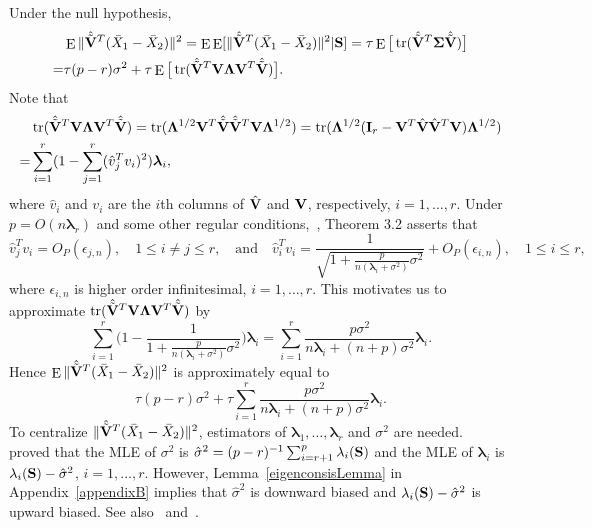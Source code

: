 \documentclass[review]{elsarticle}
\DeclareMathOperator{\mytr}{tr}
\DeclareMathOperator{\myE}{E}
\newcommand{\bfsym}[1]{\ensuremath{\boldsymbol{#1}}}
\def\blambda {\bfsym {\lambda}}        \def\bLambda {\bfsym {\Lambda}}
\theoremstyle{plain}
\theoremstyle{definition}
\theoremstyle{remark}
\begin{document}
Under the null hypothesis, 
\begin{equation*}
    \begin{aligned}
        &\myE \|\hat{\tilde{\BV}}^T (\bar{X}_1-\bar{X}_2)\|^2=\myE \myE[ \|\hat{\tilde{\BV}}^T (\bar{X}_1-\bar{X}_2)\|^2 |\BS]=
\tau \myE \big[\mytr(\hat{\tilde{\BV}}^T\bSigma\hat{\tilde{\BV}})\big]\\
        =&
\tau (p-r) \sigma^2+
\tau \myE \big[\mytr(\hat{\tilde{\BV}}^T\BV \bLambda \BV^T\hat{\tilde{\BV}})\big].%
    \end{aligned}
\end{equation*}
Note that
$$
\begin{aligned}
    &\mytr(\hat{\tilde{\BV}}^T\BV \bLambda \BV^T\hat{\tilde{\BV}})
=
\mytr( \bLambda^{1/2} \BV^T\hat{\tilde{\BV}}\hat{\tilde{\BV}}^T\BV \bLambda^{1/2} )
=
\mytr( \bLambda^{1/2} (\BI_r-\BV^T\hat{\BV}\hat{\BV}^T\BV) \bLambda^{1/2} )\\
    =&
    \sum_{i=1}^r  (1-\sum_{j=1}^r (\hat{v}_j^T v_i)^2)\blambda_i,
\end{aligned}
$$
where $\hat{v}_i$ and $v_i$ are the $i$th columns of $\hat{\mathbf{V}}$ and $\mathbf{V}$, respectively, $i=1,\ldots, r$.
Under $p=O(n\blambda_r)$ and some other regular conditions,~\cite{Fan2015Asymptotics}, Theorem 3.2 asserts that 
$$
\hat{v}_j^T v_i=O_P(\epsilon_{j,n}),\quad 1\leq i\neq j\leq r,
\quad \text{and}\quad
\hat{v}_i^T v_i=\frac{1}{\sqrt{1+ \frac{p}{n(\blambda_i+\sigma^2)}\sigma^2}}+O_P(\epsilon_{i,n}),\quad 1\leq i\leq r,
$$
where $\epsilon_{i,n}$ is higher order infinitesimal, $i=1,\ldots, r$.
This motivates us to approximate $\mytr(\hat{\tilde{\BV}}^T\BV \bLambda \BV^T\hat{\tilde{\BV}})$
by
$$
\sum_{i=1}^r \Big(1-\frac{1}{1+\frac{p}{n(\blambda_i+\sigma^2)}\sigma^2}\Big)\blambda_i
=
\sum_{i=1}^r \frac{p\sigma^2}{n\blambda_i+(n+p)\sigma^2}\blambda_i.
$$
Hence $\myE \|\hat{\tilde{\BV}}^T (\bar{X}_1-\bar{X}_2)\|^2$ is approximately equal to
$$
\tau(p-r)\sigma^2 + \tau\sum_{i=1}^r \frac{p\sigma^2}{n\blambda_i+(n+p)\sigma^2}\blambda_i.
$$
To centralize $\|\hat{\tilde{\mathbf{V}}}^T (\bar{X}_1-\bar{X}_2)\|^2$, estimators of $\blambda_1,\ldots, \blambda_r$ and $\sigma^2$ are needed.
~\cite{Anderson1986Asymptotic} proved that the MLE of $\sigma^2$ is $\hat{\sigma}^2=(p-r)^{-1}\sum_{i=r+1}^p \lambda_i(\mathbf{S})$ and the MLE of $\blambda_i$ is $\lambda_i(\mathbf{S})-\hat{\sigma}^2$, $i=1,\ldots, r$.
However, Lemma~\ref{eigenconsisLemma} in Appendix~\ref{appendixB} implies that $\hat{\sigma}^2$ is downward biased and $\lambda_i(\mathbf{S})-\hat{\sigma}^2$ is upward biased.
See also~\cite{Passemier2015} and~\cite{Fan2015Asymptotics}.
\end{document}
